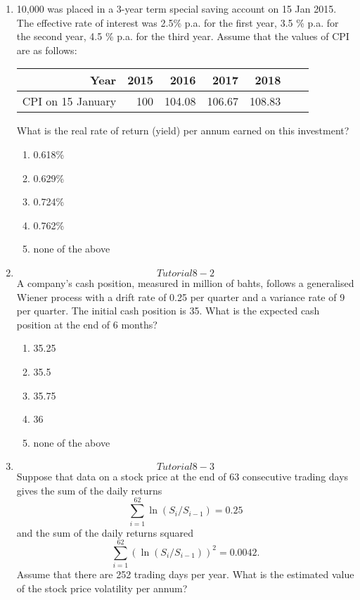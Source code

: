 \documentclass[
]{article}
\theoremstyle{definition}
\theoremstyle{definition}
\theoremstyle{definition}
\theoremstyle{definition}
\theoremstyle{remark}
\begin{document}
\begin{enumerate}
\def\labelenumi{\arabic{enumi}.}
\item
  10,000 was placed in a 3-year term special saving account on 15
  Jan 2015. The effective rate of interest was 2.5\% p.a. for the first
  year, 3.5 \% p.a. for the second year, 4.5 \% p.a. for the third year.
  Assume that the values of CPI are as follows:

  \begin{longtable}[]{@{}rrrrrll@{}}
  \toprule
  Year & 2015 & 2016 & 2017 & 2018 & & \\
  \midrule
  \endhead
  CPI on 15 January & 100 & 104.08 & 106.67 & 108.83 & & \\
  \bottomrule
  \end{longtable}

  What is the real rate of return (yield) per annum earned on this
  investment?

  \begin{enumerate}
  \def\labelenumii{\Alph{enumii}.}
  \item
    0.618\%
  \item
    0.629\%
  \item
    0.724\%
  \item
    0.762\%
  \item
    none of the above
  \end{enumerate}
\item
  \protect\hypertarget{Tutorial8-2}{}{\[Tutorial8-2\]} A company's cash position, measured in
  million of bahts, follows a generalised Wiener process with a drift
  rate of 0.25 per quarter and a variance rate of 9 per quarter. The
  initial cash position is 35. What is the expected cash position at
  the end of 6 months?

  \begin{enumerate}
  \def\labelenumii{\Alph{enumii}.}
  \item
    35.25
  \item
    35.5
  \item
    35.75
  \item
    36
  \item
    none of the above
  \end{enumerate}
\item
  \protect\hypertarget{Tutorial8-3}{}{\[Tutorial8-3\]} Suppose that data on a stock price at
  the end of 63 consecutive trading days gives the sum of the daily
  returns \[\sum_{i=1}^{62} \ln(S_i/S_{i-1}) = 0.25\] and the sum of
  the daily returns squared
  \[\sum_{i=1}^{62} \left( \ln(S_i/S_{i-1}) \right)^2= 0.0042.\]
  Assume that there are 252 trading days per year. What is the
  estimated value of the stock price volatility per annum?


\end{enumerate}
\end{document}

